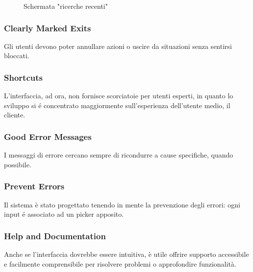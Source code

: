 \begin{figure}[h]
  \caption{Schermata "ricerche recenti"}
  \label{fig:Schermata "ricerche recenti"}
\end{figure}

\subsubsection{Clearly Marked Exits}
Gli utenti devono poter annullare azioni o uscire da situazioni senza sentirsi bloccati.

\subsubsection{Shortcuts}
L'interfaccia, ad ora, non fornisce scorciatoie per utenti esperti, in quanto
lo sviluppo si é concentrato maggiormente sull'esperienza dell'utente medio, il cliente.

\subsubsection{Good Error Messages}
I messaggi di errore cercano sempre di ricondurre a cause specifiche, quando possibile.

\subsubsection{Prevent Errors}
Il sistema è stato progettato tenendo in mente la prevenzione degli errori: ogni
input é associato ad un picker apposito.

\subsubsection{Help and Documentation}
Anche se l'interfaccia dovrebbe essere intuitiva, è utile offrire supporto accessibile e facilmente comprensibile 
per risolvere problemi o approfondire funzionalità.

